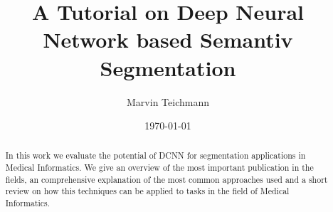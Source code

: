 \documentclass[a4paper,leqno]{scrartcl}
\title{A Tutorial on Deep Neural Network based Semantiv Segmentation}
\author{Marvin Teichmann}
\date{\today}
\begin{document}
\maketitle

\begin{abstract}
In this work we evaluate the potential of \gls{DCNN} for segmentation applications in Medical Informatics. We give an overview of the most important publication in the fields, an comprehensive explanation of the most common approaches used  and a short review on how this techniques can be applied to tasks in the field of Medical Informatics.
\end{abstract}








%



\newpage



\printglossaries
\end{document}
